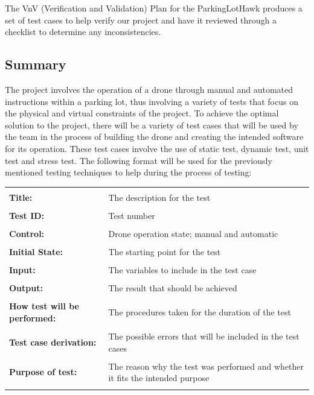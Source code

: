 \documentclass[12pt, titlepage]{article}
\begin{document}

The VnV (Verification and Validation) Plan for the ParkingLotHawk produces a set of test cases to help verify our project and have it reviewed through a checklist to determine any inconsistencies.


\subsection{Summary}

The project involves the operation of a drone through manual and automated instructions within a parking lot, thus involving a variety of tests that focus on the physical and virtual constraints of the project. To achieve the optimal solution to the project, there will be a variety of test cases that will be used by the team in the process of building the drone and creating the intended software for its operation. These test cases involve the use of static test, dynamic test, unit test and stress test. The following format will be used for the previously mentioned testing techniques to help during the process of testing:

\begin{center}
\begin{tabular}{|m{3cm} m{11cm}|}
\hline &\\
     \textbf{Title:} & The description for the test \\&\\
     \textbf{Test ID:} & Test number \\&\\
     \textbf{Control:} & Drone operation state; manual and automatic \\&\\
     \textbf{Initial State:} & The starting point for the test \\&\\
     \textbf{Input:} & The variables to include in the test case \\&\\
     \textbf{Output:} & The result that should be achieved \\&\\
     \textbf{How test will be performed:} & The procedures taken for the duration of the test \\&\\
     \textbf{Test case derivation:} & The possible errors that will be included in the test cases \\&\\
     \textbf{Purpose of test:} & The reason why the test was performed and whether it fits the intended purpose \\&\\
\hline
\end{tabular}
\end{center}
\end{document}

